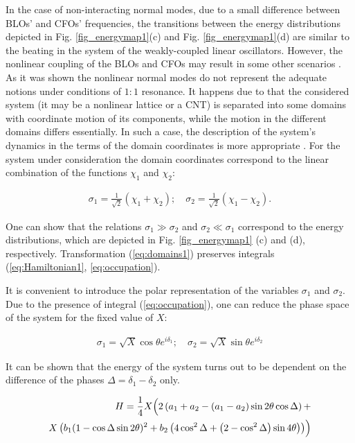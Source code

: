 In the case of non-interacting normal modes, due to a small difference between BLOs' and CFOs' frequencies, the transitions between the energy distributions depicted in Fig. \ref{fig_energymap1}(c) and  Fig. \ref{fig_energymap1}(d) are similar to the beating in the system of the  weakly-coupled linear oscillators.
However, the nonlinear coupling of the BLOs and CFOs may result in some other scenarios \cite{VVS2010,Smirnov2016PhysD}.
As it was shown \cite{VVS2010} the nonlinear normal modes do not represent the adequate notions under conditions of $1:1$ resonance.
It happens due to that the considered system (it may be a nonlinear lattice or a CNT) is separated into some domains with coordinate motion of its components, while the motion in the different domains differs essentially.
In such a case, the description of the system's dynamics in the terms of the domain coordinates is more appropriate \cite{CAP2016}.
For the system under consideration the domain coordinates correspond to the linear combination of the functions $\chi_{1}$ and $\chi_{2}$:

\begin{eqnarray}\label{eq:domains1}
\sigma_{1}=\frac{1}{\sqrt{2}} \left( \chi_{1}+ \chi_{2} \right); \quad \sigma_{2}=\frac{1}{\sqrt{2}} \left( \chi_{1} - \chi_{2} \right).
\end{eqnarray}

One can show that the relations $\sigma_{1} \gg\sigma_{2}$ and $\sigma_{2} \ll \sigma_{1}$ correspond to the energy distributions, which are depicted in Fig. \ref{fig_energymap1} (c) and (d), respectively.
Transformation (\ref{eq:domains1}) preserves integrals (\ref{eq:Hamiltonian1}, \ref{eq:occupation}).

It is convenient to introduce the polar representation of the variables $\sigma_{1}$ and $\sigma_{2}$.
Due to the presence of integral (\ref{eq:occupation}), one can reduce the phase space of the system for the fixed value of $X$:

\begin{eqnarray}\label{eq:polar}
\sigma_{1}=\sqrt{X} \cos{\theta} e^{i \delta_{1}}; \quad  \sigma_{2}=\sqrt{X} \sin{\theta} e^{i \delta_{2}}
\end{eqnarray}

It can be shown that the energy of the system turns out to be dependent on the difference of the phases $\Delta=\delta_{1}-\delta_{2}$ only.

\begin{eqnarray}\label{eq:hamiltonian2}
H   = \frac{1}{4} X \Bigl( 2 \left( a_{1}+a_{2} - \left(a_{1}-a_{2} \right)\sin{2 \theta} \cos{\Delta} \right) + \nonumber \\
  X   \left( b_{1} (1-\cos{\Delta} \sin{2 \theta} )^{2} + b_{2} \left( 4 \cos^{2}{\Delta} + \left( 2- \cos^{2}{\Delta} \right) \sin{4 \theta} \right) \right) \Bigr)
\end{eqnarray}

